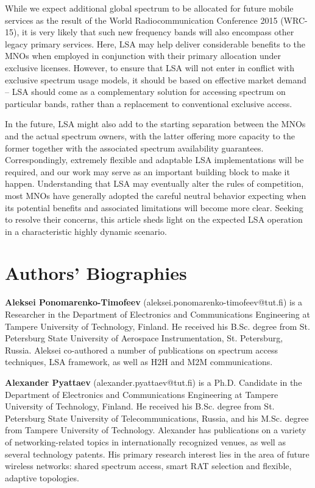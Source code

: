 \documentclass[journal]{IEEEtran}
\begin{document}
While we expect additional global spectrum to be allocated for future mobile services as the result of the World Radiocommunication Conference 2015 (WRC-15), it is very likely that such new frequency bands will also encompass other legacy primary services. Here, LSA may help deliver considerable benefits to the MNOs when employed in conjunction with their primary allocation under exclusive licenses. However, to ensure that LSA will not enter in conflict with exclusive spectrum usage models, it should be based on effective market demand -- LSA should come as a complementary solution for accessing spectrum on particular bands, rather than a replacement to conventional exclusive access.

In the future, LSA might also add to the starting separation between the MNOs and the actual spectrum owners, with the latter offering more capacity to the former together with the associated spectrum availability guarantees. Correspondingly, extremely flexible and adaptable LSA implementations will be required, and our work may serve as an important building block to make it happen. Understanding that LSA may eventually alter the rules of competition, most MNOs have generally adopted the careful neutral behavior expecting when its potential benefits and associated limitations will become more clear. Seeking to resolve their concerns, this article sheds light on the expected LSA operation in a characteristic highly dynamic scenario. 








\section*{Authors' Biographies}

\textbf{Aleksei Ponomarenko-Timofeev} (aleksei.ponomarenko-timofeev@tut.fi) is a Researcher in the Department of Electronics and Communications Engineering at Tampere University of Technology, Finland. He received his B.Sc. degree from St. Petersburg State University of Aerospace Instrumentation, St. Petersburg, Russia. Aleksei co-authored a number of publications on spectrum access techniques, LSA framework, as well as H2H and M2M communications.

\textbf{Alexander Pyattaev} (alexander.pyattaev@tut.fi) is a Ph.D. Candidate in the Department of Electronics and Communications Engineering at Tampere University of Technology, Finland. He received his B.Sc. degree from St. Petersburg State University of Telecommunications, Russia, and his M.Sc. degree from Tampere University of Technology. Alexander has publications on a variety of networking-related topics in internationally recognized venues, as well as several technology patents. His primary research interest lies in the area of future wireless networks: shared spectrum access, smart RAT selection and flexible, adaptive topologies.
\end{document}
